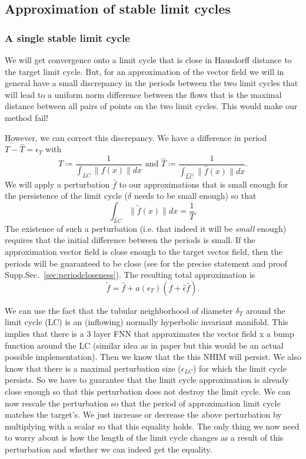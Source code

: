 \documentclass{article}
\theoremstyle{definition}
\theoremstyle{remark}
\newcounter{ct}
\begin{document}
\subsection{Approximation of stable limit cycles}
%
%
\subsubsection{A single stable limit cycle}
We will get convergence onto a limit cycle that is close in Hausdorff distance to the target limit cycle. %
But, for an approximation of the vector field we will in general have a small discrepancy in the periods between the two limit cycles that will lead to a uniform norm difference between the flows that is the maximal distance between all pairs of points on the two limit cycles.
This would make our method fail!

However, we can correct this discrepancy.
We have a difference in period $T-\hat T = \epsilon_T$
with \[T\coloneqq\frac{1}{\int_{LC}\|f(x)\|dx} \text{ and } \hat T\coloneqq\frac{1}{\int_{\hat{LC}}\|\hat f(x)\|dx}.\]
%
We will apply a perturbation $\bar{f}$ to our approximations that is small enough for the persistence of the limit cycle ($\delta$ needs to be small enough) 
so that 
\[\int_{\tilde{LC}}\|\tilde{f}(x)\| dx = \frac{1}{T}. 	\]%
The existence of such a perturbation (i.e. that indeed it will be \emph{small} enough) requires that the initial difference between the periods is small.
If the approximation vector field is close enough to the target vector field, then the periods will be guaranteed to be close (see for the precise statement and proof Supp.Sec.~\ref{sec:periodcloseness}).
The resulting total approximation is \[\tilde{f}=%
 \hat{f} + a(\epsilon_T)(\hat{f} + \hat{\epsilon}\bar{f}).\]


We can use the fact that the tubular neighborhood of diameter $\delta_T$ around the limit cycle (LC) is an (inflowing) normally hyperbolic invariant manifold.
This implies that there is a 3 layer FNN that approximates the vector field x a bump function around the LC (similar idea as in paper but this would be an actual possible implementation).
Then we know that the this NHIM will persist.
We also know that there is a maximal perturbation size ($\epsilon_{LC}$) for which the limit cycle persists.
So we have to guarantee that the limit cycle approximation is already close enough so that this perturbation does not destroy the limit cycle.
We can now rescale the perturbation so that the period of approximation limit cycle matches the target's. 
We just increase or decrease  the above perturbation by multiplying with a scalar so that this equality holds.
The only thing we now need to worry about is how the length of the limit cycle changes as a result of this perturbation and whether we can indeed get the equality.
\end{document}
